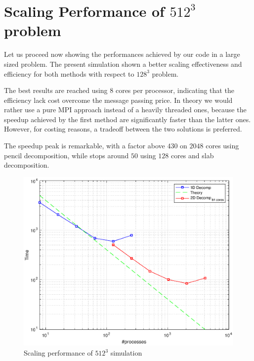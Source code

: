 \section{Scaling Performance of $512^3$ problem}
Let us proceed now showing the performances achieved by our code in a large sized problem.
The present simulation shown a better scaling effectiveness and efficiency for both methods with respect to $128^{3}$ problem. 
\par
The best results are reached using 8 cores per processor, indicating that the efficiency lack cost overcome the message passing price.
In theory we would rather use a pure MPI approach instead of a heavily threaded ones, because the speedup achieved by the first method are significantly faster than the latter ones. However, for costing reasons, a tradeoff between the two solutions is preferred. \\
\par
The speedup peak is remarkable, with a factor above $430$ on $2048$ cores using pencil decomposition, while stops around $50$ using $128$ cores and slab decomposition. \\
\par

\begin{figure}
\begin{center}
\includegraphics[scale=0.6]{grafici/5121}
\caption{Scaling performance of $512^3$ simulation}
\label{5121}
\end{center}
\end{figure}

